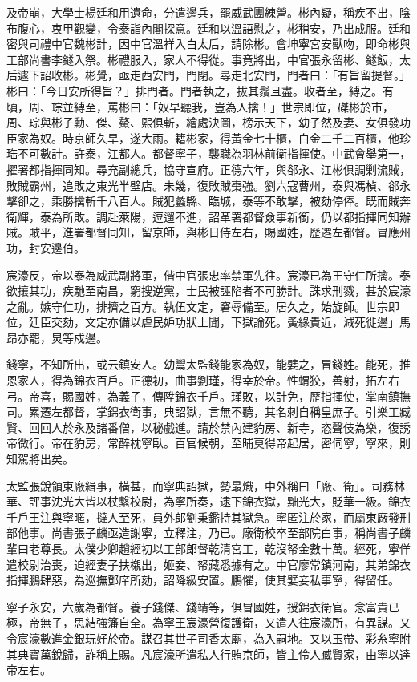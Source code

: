 \begin{pinyinscope}
及帝崩，大學士楊廷和用遺命，分遣邊兵，罷威武團練營。彬內疑，稱疾不出，陰布腹心，衷甲觀變，令泰詣內閣探意。廷和以溫語慰之，彬稍安，乃出成服。廷和密與司禮中官魏彬計，因中官溫祥入白太后，請除彬。會坤寧宮安獸吻，即命彬與工部尚書李鐩入祭。彬禮服入，家人不得從。事竟將出，中官張永留彬、鐩飯，太后遽下詔收彬。彬覺，亟走西安門，門閉。尋走北安門，門者曰：「有旨留提督。」彬曰：「今日安所得旨？」排門者。門者執之，拔其鬚且盡。收者至，縛之。有頃，周、琮並縛至，罵彬曰：「奴早聽我，豈為人擒！」世宗即位，磔彬於市，周、琮與彬子勳、傑、鰲、熙俱斬，繪處決圖，榜示天下，幼子然及妻、女俱發功臣家為奴。時京師久旱，遂大雨。籍彬家，得黃金七十櫃，白金二千二百櫃，他珍珤不可數計。許泰，江都人。都督寧子，襲職為羽林前衛指揮使。中武會舉第一，擢署都指揮同知。尋充副總兵，協守宣府。正德六年，與郤永、江彬俱調剿流賊，敗賊霸州，追敗之東光半壁店。未幾，復敗賊棗強。劉六寇曹州，泰與馮楨、郤永擊卻之，乘勝擒斬千八百人。賊犯蠡縣、臨城，泰等不敢擊，被劾停俸。既而賊奔衛輝，泰為所敗。調赴萊陽，逗遛不進，詔革署都督僉事新銜，仍以都指揮同知辦賊。賊平，進署都督同知，留京師，與彬日侍左右，賜國姓，歷遷左都督。冒應州功，封安邊伯。

宸濠反，帝以泰為威武副將軍，偕中官張忠率禁軍先往。宸濠已為王守仁所擒。泰欲攘其功，疾馳至南昌，窮搜逆黨，士民被誣陷者不可勝計。誅求刑戮，甚於宸濠之亂。嫉守仁功，排擠之百方。執伍文定，窘辱備至。居久之，始旋師。世宗即位，廷臣交劾，文定亦備以虐民妒功狀上聞，下獄論死。夤緣貴近，減死徙邊」馬昂亦罷，炅等戍邊。

錢寧，不知所出，或云鎮安人。幼鬻太監錢能家為奴，能嬖之，冒錢姓。能死，推恩家人，得為錦衣百戶。正德初，曲事劉瑾，得幸於帝。性蝟狡，善射，拓左右弓。帝喜，賜國姓，為義子，傳陞錦衣千戶。瑾敗，以計免，歷指揮使，掌南鎮撫司。累遷左都督，掌錦衣衛事，典詔獄，言無不聽，其名刺自稱皇庶子。引樂工臧賢、回回人於永及諸番僧，以秘戲進。請於禁內建豹房、新寺，恣聲伎為樂，復誘帝微行。帝在豹房，常醉枕寧臥。百官候朝，至晡莫得帝起居，密伺寧，寧來，則知駕將出矣。

太監張銳領東廠緝事，橫甚，而寧典詔獄，勢最熾，中外稱曰「廠、衛」。司務林華、評事沈光大皆以杖繫校尉，為寧所奏，逮下錦衣獄，黜光大，貶華一級。錦衣千戶王注與寧暱，撻人至死，員外郎劉秉鑑持其獄急。寧匿注於家，而屬東廠發刑部他事。尚書張子麟亟造謝寧，立釋注，乃已。廠衛校卒至部院白事，稱尚書子麟輩曰老尊長。太僕少卿趙經初以工部郎督乾清宮工，乾沒帑金數十萬。經死，寧佯遣校尉治喪，迫經妻子扶櫬出，姬妾、帑藏悉據有之。中官廖常鎮河南，其弟錦衣指揮鵬肆惡，為巡撫鄧庠所劾，詔降級安置。鵬懼，使其嬖妾私事寧，得留任。

寧子永安，六歲為都督。養子錢傑、錢靖等，俱冒國姓，授錦衣衛官。念富貴已極，帝無子，思結強籓自全。為寧王宸濠營復護衛，又遣人往宸濠所，有異謀。又令宸濠數進金銀玩好於帝。謀召其世子司香太廟，為入嗣地。又以玉帶、彩糸寧附其典寶萬銳歸，詐稱上賜。凡宸濠所遣私人行賄京師，皆主伶人臧賢家，由寧以達帝左右。


\end{pinyinscope}
